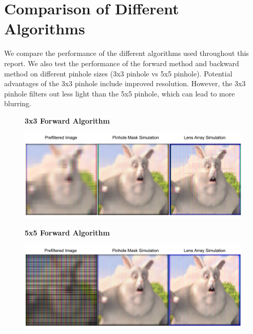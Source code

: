 \chapter{Comparison of Different Algorithms}


We compare the performance of the different algorithms used throughout this report. We also test the performance of the forward method and backward method on different pinhole sizes (3x3 pinhole vs 5x5 pinhole). Potential advantages of the 3x3 pinhole include improved resolution. However, the 3x3 pinhole filters out less light than the 5x5 pinhole, which can lead to more blurring.  

\begin{figure}
    \centering
    \textbf{3x3 Forward Algorithm}\par\medskip
    \includegraphics[width=\columnwidth]{chapters/chapter9/images/3x3_forward.png}
\end{figure}

\begin{figure}
    \centering
    \textbf{5x5 Forward Algorithm}\par\medskip
    \includegraphics[width=\columnwidth]{chapters/chapter9/images/5x5_forward.png}
\end{figure}


